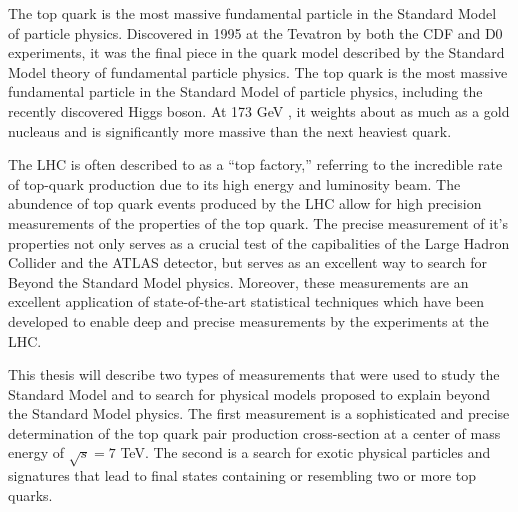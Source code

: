
%




The top quark is the most massive fundamental particle in the Standard Model of particle physics.
Discovered in 1995 at the Tevatron by both the CDF and D0 experiments, it was the final piece in the quark model described by the Standard Model theory of fundamental particle physics.
The top quark is the most massive fundamental particle in the Standard Model of particle physics, including the recently discovered Higgs boson.
At 173 GeV \cite{PARTICLE_DATA_GROUP}, it weights about as much as a gold nucleaus and is significantly more massive than the next heaviest quark.

The LHC is often described to as a ``top factory,'' referring to the incredible rate of top-quark production due to its high energy and luminosity beam.
The abundence of top quark events produced by the LHC allow for high precision measurements of the properties of the top quark.
The precise measurement of it's properties not only serves as a crucial test of the capibalities of the Large Hadron Collider and the ATLAS detector, but serves as an excellent way to search for Beyond the Standard Model physics.  
Moreover, these measurements are an excellent application of state-of-the-art statistical techniques which have been developed to enable deep and precise measurements by the experiments at the LHC.

This thesis will describe two types of measurements that were used to study the Standard Model and to search for physical models proposed to explain beyond the Standard Model physics.
The first measurement is a sophisticated and precise determination of the top quark pair production cross-section at a center of mass energy of $\sqrt{s} = 7$ TeV.
The second is a search for exotic physical particles and signatures that lead to final states containing or resembling two or more top quarks.



